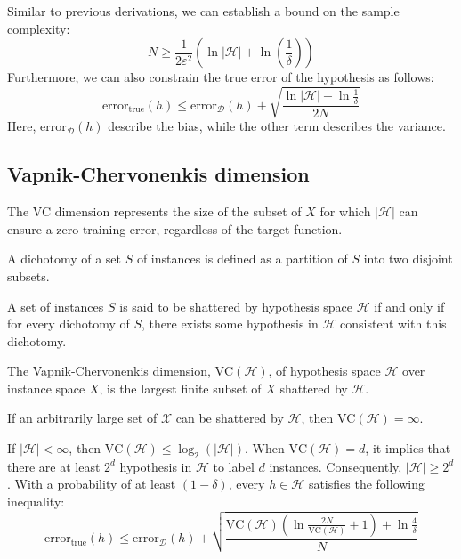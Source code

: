 Similar to previous derivations, we can establish a bound on the sample complexity:
\[N\geq\dfrac{1}{2\varepsilon^2}\left(\ln\left\lvert \mathcal{H}\right\rvert+\ln\left(\dfrac{1}{\delta}\right)\right)\]
Furthermore, we can also constrain the true error of the hypothesis as follows:
\[\text{error}_{\text{true}}(h)\leq \text{error}_{\mathcal{D}}(h)+\sqrt{\dfrac{\ln\left\lvert \mathcal{H} \right\rvert+\ln\frac{1}{\delta}}{2N}}\]
Here, $\text{error}_{\mathcal{D}}(h)$ describe the bias, while the other term describes the variance. 






\subsection{Vapnik-Chervonenkis dimension}
The VC dimension represents the size of the subset of $X$ for which $\left\lvert \mathcal{H}\right\rvert$ can ensure a zero training error, regardless of the target function. 
\begin{definition}
    A dichotomy of a set $S$ of instances is defined as a partition of $S$ into two disjoint subsets. 
\end{definition}
\begin{definition}
    A set of instances $S$ is said to be shattered by hypothesis space $\mathcal{H}$ if and only if for every dichotomy of $S$, there exists some hypothesis in $\mathcal{H}$ consistent with this dichotomy.
\end{definition}
\begin{definition}
    The Vapnik-Chervonenkis dimension, $\text{VC}(\mathcal{H})$, of hypothesis space $\mathcal{H}$ over instance space $X$, is the largest finite subset of $X$ shattered by $\mathcal{H}$.
\end{definition}
If an arbitrarily large set of $\mathcal{X}$ can be shattered by $\mathcal{H}$, then $\text{VC}(\mathcal{H})=\infty$.

If $\left\lvert \mathcal{H}\right\rvert < \infty$, then $\text{VC}(\mathcal{H}) \leq \log_2(\left\lvert \mathcal{H}\right\rvert)$.
When $\text{VC}(\mathcal{H})=d$, it implies that there are at least $2^d$ hypothesis in $\mathcal{H}$ to label $d$ instances. 
Consequently, $\left\lvert \mathcal{H}\right\rvert \geq 2^d$.
With a probability of at least $(1-\delta)$, every $h\in \mathcal{H}$ satisfies the following inequality:
\[\text{error}_{\text{true}}(h)\leq \text{error}_{\mathcal{D}}(h)+\sqrt{\dfrac{\text{VC}(\mathcal{H})\left(\ln\frac{2N}{\text{VC}(\mathcal{H})}+1\right)+\ln\frac{4}{\delta}}{N}}\]
